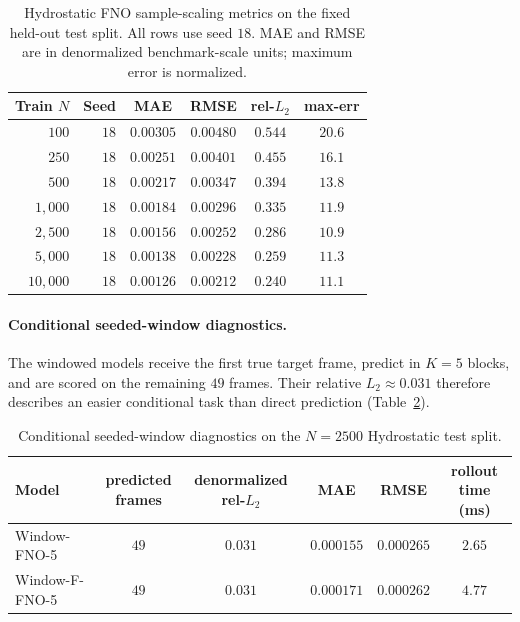 \begin{table}[pos=!htbp]
\centering
\caption{Hydrostatic FNO sample-scaling metrics on the fixed held-out test split. All rows use seed $18$. MAE and RMSE are in denormalized benchmark-scale units; maximum error is normalized.}
\label{tab:sample-scaling}
\begin{tabular}{rrcccc}
    \toprule
    Train $N$ & Seed & MAE & RMSE & rel-$L_2$ & max-err \\
    \midrule
    $100$ & $18$ & $0.00305$ & $0.00480$ & $0.544$ & $20.6$ \\
    $250$ & $18$ & $0.00251$ & $0.00401$ & $0.455$ & $16.1$ \\
    $500$ & $18$ & $0.00217$ & $0.00347$ & $0.394$ & $13.8$ \\
    $1{,}000$ & $18$ & $0.00184$ & $0.00296$ & $0.335$ & $11.9$ \\
    $2{,}500$ & $18$ & $0.00156$ & $0.00252$ & $0.286$ & $10.9$ \\
    $5{,}000$ & $18$ & $0.00138$ & $0.00228$ & $0.259$ & $11.3$ \\
    $10{,}000$ & $18$ & $0.00126$ & $0.00212$ & $0.240$ & $11.1$ \\
    \bottomrule
\end{tabular}
\end{table}

\paragraph{Conditional seeded-window diagnostics.}
The windowed models receive the first true target frame, predict in $K=5$ blocks, and are scored on the remaining $49$ frames. Their relative $L_2\approx0.031$ therefore describes an easier conditional task than direct prediction (Table~\ref{tab:app-window}).

\begin{table}[pos=!htbp]
\centering
\caption{Conditional seeded-window diagnostics on the $N = 2500$ Hydrostatic test split.}
\label{tab:app-window}
\small
\setlength{\tabcolsep}{4pt}
\begin{tabular}{lccccc}
    \toprule
    Model & \shortstack{predicted\\frames} & \shortstack{denormalized\\rel-$L_2$} & MAE & RMSE & \shortstack{rollout time\\(ms)} \\
    \midrule
    Window-FNO-5 & $49$ & $0.031$ & $0.000155$ & $0.000265$ & $2.65$ \\
    Window-F-FNO-5 & $49$ & $0.031$ & $0.000171$ & $0.000262$ & $4.77$ \\
    \bottomrule
\end{tabular}
\end{table}

